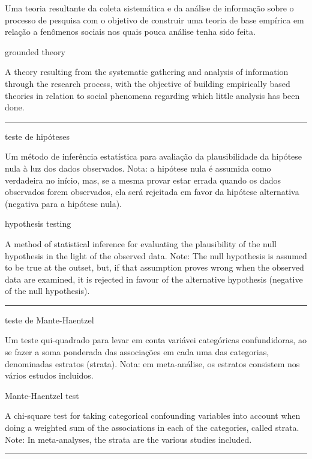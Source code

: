 \documentclass[
  openany]{book}
\begin{document}
Uma teoria resultante da coleta sistemática e da análise de informação sobre o processo de pesquisa com o objetivo de construir uma teoria de base empírica em relação a fenômenos sociais nos quais pouca análise tenha sido feita.

grounded theory

A theory resulting from the systematic gathering and analysis of information through the research process, with the objective of building empirically based theories in relation to social phenomena regarding which little analysis has been done.

\begin{center}\rule{0.5\linewidth}{0.5pt}\end{center}

teste de hipóteses

Um método de inferência estatística para avaliação da plausibilidade da hipótese nula à luz dos dados observados. Nota: a hipótese nula é assumida como verdadeira no início, mas, se a mesma provar estar errada quando os dados observados forem observados, ela será rejeitada em favor da hipótese alternativa (negativa para a hipótese nula).

hypothesis testing

A method of statistical inference for evaluating the plausibility of the null hypothesis in the light of the observed data. Note: The null hypothesis is assumed to be true at the outset, but, if that assumption proves wrong when the observed data are examined, it is rejected in favour of the alternative hypothesis (negative of the null hypothesis).

\begin{center}\rule{0.5\linewidth}{0.5pt}\end{center}

teste de Mante-Haentzel

Um teste qui-quadrado para levar em conta variávei categóricas confundidoras, ao se fazer a soma ponderada das associações em cada uma das categorias, denominadas estratos (strata). Nota: em meta-análise, os estratos consistem nos vários estudos incluidos.

Mante-Haentzel test

A chi-square test for taking categorical confounding variables into account when doing a weighted sum of the associations in each of the categories, called strata. Note: In meta-analyses, the strata are the various studies included.

\begin{center}\rule{0.5\linewidth}{0.5pt}\end{center}
\end{document}
